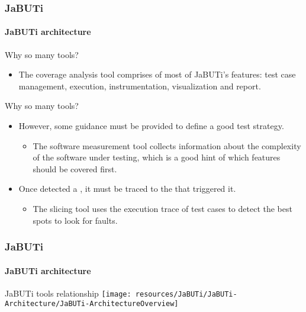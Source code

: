 \begin{frame}
\frametitle{JaBUTi}
\framesubtitle{JaBUTi architecture}

\begin{block:fact}{Why so many tools?}
\begin{itemize}
	\item The coverage analysis tool comprises of most of JaBUTi's features:
	test case management, execution, instrumentation, visualization and report.
\end{itemize}
\end{block:fact}

\begin{block:fact}{Why so many tools?}
\begin{itemize}
	\item However, some guidance must be provided to define a good test
	strategy.
	\begin{itemize}
		\item The software measurement tool collects information about the
		complexity of the software under testing, which is a good hint of
		which features should be covered first.
	\end{itemize}

	\item Once detected a , it must be traced to the
	 that triggered it.
	\begin{itemize}
		\item The slicing tool uses the execution trace of test cases to
		detect the best spots to look for faults.
	\end{itemize}
\end{itemize}
\end{block:fact}
\end{frame}


\begin{frame}[parent={cmap:jabuti},hasnext=false,hasprev=true]
\frametitle{JaBUTi}
\framesubtitle{JaBUTi architecture}

\begin{block:fact}{JaBUTi tools relationship}
\texttt{[image: resources/JaBUTi/JaBUTi-Architecture/JaBUTi-ArchitectureOverview]}
\end{block:fact}

\end{frame}